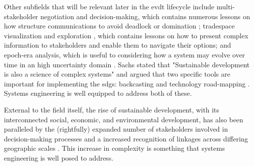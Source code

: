 Other subfields that will be relevant later in the \ac{evdt} lifecycle include multi-stakeholder negotiation and decision-making, which contains numerous lessons on how structure communications to avoid deadlock or domination \cite{fitzgeraldEffectsEnhancedMultiparty2015,fitzgeraldRecommendationsFramingMultistakeholder2016,weckMULTISTAKEHOLDERSIMULATIONGAMING2012}; tradespace visualization and exploration \cite{fitzgeraldEffectsEnhancedMultiparty2015,fitzgeraldRecommendationsFramingMultistakeholder2016,groganInteractiveModelsSystem2015,rossMultiAttributeTradespaceExploration2004,selvavaleroRulebasedSystemArchitecting2012}, which contains lessons on how to present complex information to stakeholders and enable them to navigate their options; and epoch-era analysis, which is useful to considering how a system may evolve over time in an high uncertainty domain \cite{rossUsingNaturalValueCentric2008,vascikMethodExploringProgram2015}. Sachs stated that "Sustainable development is also a science of complex systems" and argued that two specific tools are important for implementing the \acp{sdg}: backcasting and technology road-mapping \cite{sachsAgeSustainableDevelopment2015}. Systems engineering is well equipped to address both of these.

External to the field itself, the rise of sustainable development, with its interconnected social, economic, and environmental development, has also been paralleled by the (rightfully) expanded number of stakeholders involved in decision-making processes and a increased recognition of linkages across differing geographic scales \cite{brommelstroetPlanningSupportSystems2010}. This increase in complexity is something that systems engineering is well posed to address.





